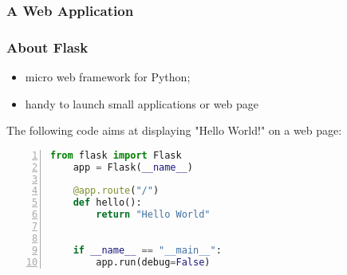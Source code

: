 \begin{frame}
  \frametitle{A Web Application}
\end{frame}

\begin{frame}
  \frametitle{About Flask}

  \begin{itemize}
    \item micro web framework for Python;
    \item handy to launch small applications or web page
  \end{itemize}

The following code aims at displaying "Hello World!" on a web page: 

  \begin{lstlisting}[language=Python,numbers=left]
    from flask import Flask
    app = Flask(__name__)

    @app.route("/")
    def hello():
        return "Hello World"


    if __name__ == "__main__":
        app.run(debug=False)
  \end{lstlisting}

\end{frame}
